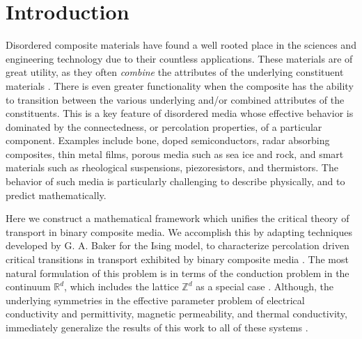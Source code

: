 \documentclass[english,12pt,jmp,graphicx]{revtex4-1}
\begin{document}

\maketitle %

%
\section{Introduction}\label{sec:Introduction}
%
Disordered composite materials have found a well rooted place in the
sciences and engineering technology due to their countless
applications. These materials are of great utility, as they often
\emph{combine} the attributes of the underlying constituent materials
\cite{MILTON:2002:TC}. There is even greater functionality when the
composite has the ability to transition between the various underlying
and/or combined attributes of the constituents. This is a key feature
of disordered media whose effective behavior is dominated by the
connectedness, or percolation properties, of a particular
component. Examples include bone, doped semiconductors, radar
absorbing composites, thin metal films, porous media such as sea ice
and rock, and smart materials such as rheological suspensions,
piezoresistors, and thermistors. The behavior of such media is
particularly  challenging to describe physically, and to predict
mathematically. 

Here we construct a mathematical framework which unifies the critical
theory of transport in binary composite media. We accomplish this by
adapting techniques developed by G. A. Baker
for the Ising model, to characterize percolation driven critical
transitions in transport exhibited by binary composite media
\cite{Baker-1990}.  The most natural formulation of this problem is in
terms of the conduction problem in  
the continuum $\mathbb{R}^d$, which includes the lattice
$\mathbb{Z}^d$ as a special case
\cite{Golden:JMP-5627,Golden:CMP-473}. Although, the underlying
symmetries in the effective parameter problem of electrical
conductivity and permittivity, magnetic permeability, and thermal
conductivity, immediately generalize the results of this work to
all of these systems \cite{MILTON:2002:TC}. 
\end{document}
